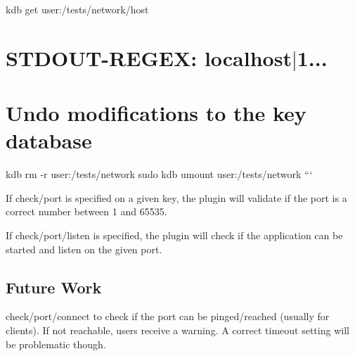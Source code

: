 kdb get user\+:/tests/network/host \hypertarget{autotoc_md459_autotoc_md472}{}\section{S\+T\+D\+O\+U\+T-\/\+R\+E\+G\+E\+X\+: localhost$\vert$1...}\label{autotoc_md459_autotoc_md472}
\hypertarget{autotoc_md459_autotoc_md473}{}\section{Undo modifications to the key database}\label{autotoc_md459_autotoc_md473}
kdb rm -\/r user\+:/tests/network sudo kdb umount user\+:/tests/network ```

If {\ttfamily check/port} is specified on a given key, the plugin will validate if the port is a correct number between 1 and 65535.

If {\ttfamily check/port/listen} is specified, the plugin will check if the application can be started and listen on the given port.\hypertarget{autotoc_md459_autotoc_md474}{}\subsection{Future Work}\label{autotoc_md459_autotoc_md474}
{\ttfamily check/port/connect} to check if the port can be pinged/reached (usually for clients). If not reachable, users receive a warning. A correct timeout setting will be problematic though. 